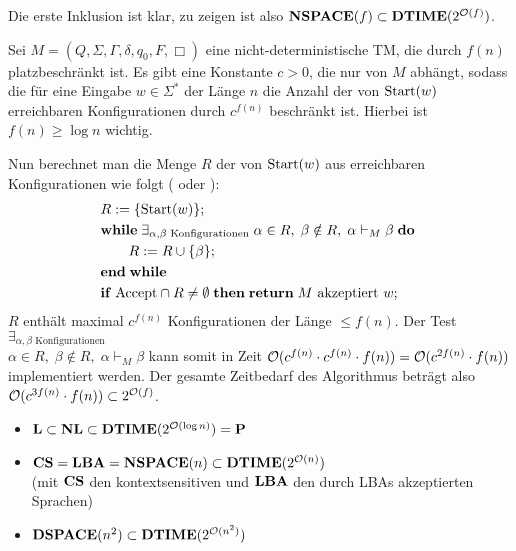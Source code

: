 \begin{Beweis}
    Die erste Inklusion ist klar, zu zeigen ist also $\mathbf{NSPACE}(f) \subset \mathbf{DTIME}(2^{\mathcal{O}(f)})$.

    Sei $M = (Q, \Sigma, \Gamma, \delta, q_0, F, \Box)$ eine nicht-deterministische TM,
    die durch $f(n)$ platzbeschränkt ist.
    Es gibt eine Konstante $c > 0$, die nur von $M$ abhängt, sodass
    die für eine Eingabe $w \in \Sigma^\ast$ der Länge $n$ die Anzahl der von $\text{Start}(w)$
    erreichbaren Konfigurationen durch $c^{f(n)}$ beschränkt ist.
    Hierbei ist $f(n) \ge \log n$ wichtig.

    Nun berechnet man die Menge $R$ der von $\text{Start}(w)$ aus erreichbaren Konfigurationen wie folgt
    ( oder ):
    \begin{align*}&
        R := \{\text{Start}(w)\};\\&
        \mathbf{while}\; \exists_{\alpha, \beta \text{ Konfigurationen}}\; \alpha \in R,\; \beta \notin R,\;
        \alpha \vdash_M \beta \;\mathbf{do}\;\\&
        \qquad R := R \cup \{\beta\};\\&
        \mathbf{end}\;\mathbf{while}\;\\&
        \mathbf{if}\; \text{Accept} \cap R \not= \emptyset \;\mathbf{then}\; \mathbf{return}\; M \text{ akzeptiert } w;
    \end{align*}
    $R$ enthält maximal $c^{f(n)}$ Konfigurationen der Länge $\le f(n)$.
    Der Test $\exists_{\alpha, \beta \text{ Konfigurationen}}$\\
    $\alpha \in R,\; \beta \notin R,\; \alpha \vdash_M \beta$ kann somit in Zeit
    $\mathcal{O}(c^{f(n)} \cdot c^{f(n)} \cdot f(n)) = \mathcal{O}(c^{2f(n)} \cdot f(n))$
    implementiert werden.
    Der gesamte Zeitbedarf des Algorithmus beträgt also
    $\mathcal{O}(c^{3f(n)} \cdot f(n)) \subset 2^{\mathcal{O}(f)}$.
\end{Beweis}

\linie

\begin{Kor}
    \begin{itemize}
        \item
        $\mathbf{L} \subset \mathbf{NL} \subset \mathbf{DTIME}(2^{\mathcal{O}(\log n)}) = \mathbf{P}$

        \item
        $\mathbf{CS} = \mathbf{LBA} = \mathbf{NSPACE}(n) \subset \mathbf{DTIME}(2^{\mathcal{O}(n)})$\\
        (mit $\mathbf{CS}$ den kontextsensitiven und $\mathbf{LBA}$ den durch LBAs akzeptierten Sprachen)

        \item
        $\mathbf{DSPACE}(n^2) \subset \mathbf{DTIME}(2^{\mathcal{O}(n^2)})$
    \end{itemize}
\end{Kor}

